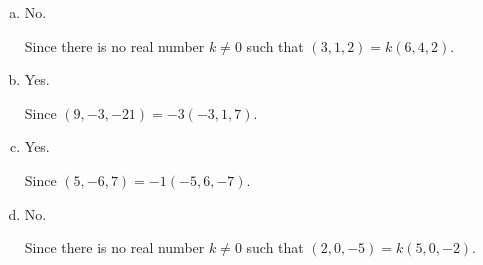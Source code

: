 \begin{Exercise}
\begin{enumerate}[(a)]
\item 
\begin{answer}
No.
\end{answer}
\begin{solution}
Since there is no real number $k\neq 0$ such that $(3,1,2)=k(6,4,2)$.
\end{solution}

\item
\begin{answer}
Yes.
\end{answer}
\begin{solution}
Since $(9,-3,-21) = -3(-3,1,7)$.
\end{solution}

\item
\begin{answer}
Yes.
\end{answer}
\begin{solution}
Since $(5,-6,7) = -1(-5,6,-7)$.
\end{solution}

\item
\begin{answer}
No.
\end{answer}
\begin{solution}
Since there is no real number $k\neq 0$ such that $(2,0,-5)=k(5,0,-2)$.
\end{solution}
\end{enumerate}
\end{Exercise}